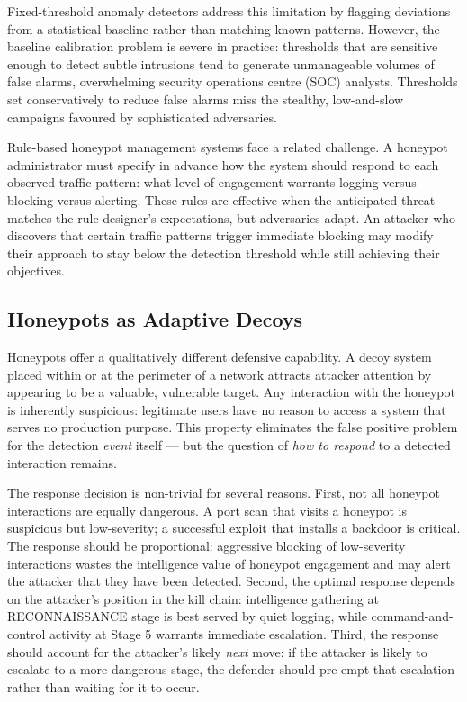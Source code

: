 Fixed-threshold anomaly detectors address this limitation by flagging deviations
from a statistical baseline rather than matching known patterns.
However, the baseline calibration problem is severe in practice: thresholds
that are sensitive enough to detect subtle intrusions tend to generate
unmanageable volumes of false alarms, overwhelming security operations centre
(SOC) analysts.
Thresholds set conservatively to reduce false alarms miss the stealthy,
low-and-slow campaigns favoured by sophisticated adversaries.

Rule-based honeypot management systems face a related challenge.
A honeypot administrator must specify in advance how the system should respond
to each observed traffic pattern: what level of engagement warrants logging
versus blocking versus alerting.
These rules are effective when the anticipated threat matches the rule designer's
expectations, but adversaries adapt.
An attacker who discovers that certain traffic patterns trigger immediate
blocking may modify their approach to stay below the detection threshold
while still achieving their objectives.

\subsection{Honeypots as Adaptive Decoys}

Honeypots offer a qualitatively different defensive capability.
A decoy system placed within or at the perimeter of a network attracts
attacker attention by appearing to be a valuable, vulnerable target.
Any interaction with the honeypot is inherently suspicious: legitimate users
have no reason to access a system that serves no production purpose.
This property eliminates the false positive problem for the detection
\emph{event} itself --- but the question of \emph{how to respond} to a
detected interaction remains.

The response decision is non-trivial for several reasons.
First, not all honeypot interactions are equally dangerous.
A port scan that visits a honeypot is suspicious but low-severity; a
successful exploit that installs a backdoor is critical.
The response should be proportional: aggressive blocking of low-severity
interactions wastes the intelligence value of honeypot engagement and
may alert the attacker that they have been detected.
Second, the optimal response depends on the attacker's position in the kill
chain: intelligence gathering at RECONNAISSANCE stage is best served by
quiet logging, while command-and-control activity at Stage 5 warrants
immediate escalation.
Third, the response should account for the attacker's likely \emph{next}
move: if the attacker is likely to escalate to a more dangerous stage,
the defender should pre-empt that escalation rather than waiting for it to
occur.


